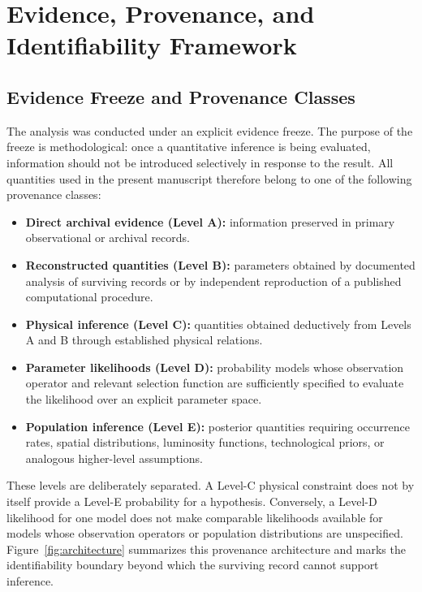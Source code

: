 \documentclass[twocolumn]{aastex701}
\begin{document}
\section{Evidence, Provenance, and Identifiability Framework}
\label{sec:provenance}

\subsection{Evidence Freeze and Provenance Classes}

The analysis was conducted under an explicit evidence freeze. The purpose of the freeze is methodological: once a quantitative inference is being evaluated, information should not be introduced selectively in response to the result. All quantities used in the present manuscript therefore belong to one of the following provenance classes:

\begin{itemize}
    \item \textbf{Direct archival evidence (Level A):} information preserved in primary observational or archival records.
    \item \textbf{Reconstructed quantities (Level B):} parameters obtained by documented analysis of surviving records or by independent reproduction of a published computational procedure.
    \item \textbf{Physical inference (Level C):} quantities obtained deductively from Levels A and B through established physical relations.
    \item \textbf{Parameter likelihoods (Level D):} probability models whose observation operator and relevant selection function are sufficiently specified to evaluate the likelihood over an explicit parameter space.
    \item \textbf{Population inference (Level E):} posterior quantities requiring occurrence rates, spatial distributions, luminosity functions, technological priors, or analogous higher-level assumptions.
\end{itemize}

These levels are deliberately separated. A Level-C physical constraint does not by itself provide a Level-E probability for a hypothesis. Conversely, a Level-D likelihood for one model does not make comparable likelihoods available for models whose observation operators or population distributions are unspecified. Figure~\ref{fig:architecture} summarizes this provenance architecture and marks the identifiability boundary beyond which the surviving record cannot support inference.
\end{document}
